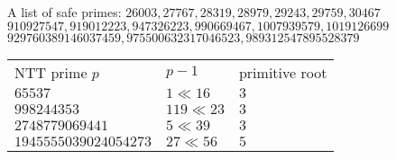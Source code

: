 A list of safe primes:
$26003, 27767, 28319, 28979, 29243, 29759, 30467$ \\
$910927547, 919012223, 947326223, 990669467, 1007939579, 1019126699$ \\
$929760389146037459, 975500632317046523, 989312547895528379$ \\
\begin{tabular}{|l|l|l|}
    NTT prime $p$         & $p - 1$      & primitive root   \\
    $65537$               & $1 \ll 16$   & $3$              \\
    $998244353$           & $119 \ll 23$ & $3$              \\
    $2748779069441$       & $5 \ll 39$   & $3$              \\
    $1945555039024054273$ & $27 \ll 56$  & $5$              \\
\end{tabular}
